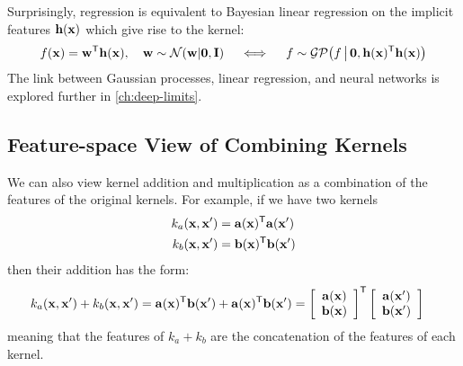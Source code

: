 Surprisingly, \gp{} regression is equivalent to Bayesian linear regression on the implicit features ${\bf{h}}({\bf{x}})$ which give rise to the kernel:
%
\begin{align}
f({\bf{x}}) = {\bf{w}}^{\mathsf{T}} {\bf{h}}({\bf{x}}), \quad {\bf{w}} \sim \mathcal{N}\!\left({\bf{w}} \middle| {\bf{0}},\mathbf{I}\right) \quad
\iff
\quad f \sim \mathcal{GP}\!\left(f \, \middle| \, {\bf{0}}, {\bf{h}}({\bf{x}}) ^{\mathsf{T}} {\bf{h}}({\bf{x}}) \right)
\end{align}
%
The link between Gaussian processes, linear regression, and neural networks is explored further in \cref{ch:deep-limits}.


\subsection{Feature-space View of Combining Kernels}

\def\feata{\va}
\def\featb{\vb}



We can also view kernel addition and multiplication as a combination of the features of the original kernels.
For example, if we have two kernels
%
\begin{align}
k_a(\iva, \iva') & = \feata(\iva)\tra \feata(\iva')\\
k_b(\iva, \iva') & = \featb(\iva)\tra \featb(\iva')
\end{align}
%
then their addition has the form:
%
\begin{align}
k_a(\iva, \iva') + k_b(\iva, \iva')
& = \feata(\iva)\tra \featb(\iva') + \feata(\iva)\tra \featb(\iva') 
 = \colvec{\feata(\iva)}{\featb(\iva)}\tra \colvec{\feata(\iva')}{\featb(\iva')}
\end{align}
%
meaning that the features of $k_a + k_b$ are the concatenation of the features of each kernel.


